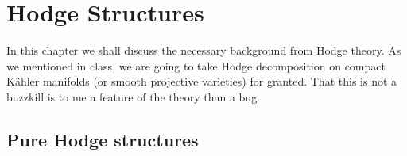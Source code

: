 \documentclass[a4paper,12pt]{book}
\begin{document}
\chapter{Hodge Structures}
\label{chap:hodge-structures}

In this chapter we shall discuss the necessary background from Hodge theory. As we mentioned in class, we are going to take Hodge decomposition on compact K\"ahler manifolds (or smooth projective varieties) for granted. That this is not a buzzkill is to me a feature of the theory than a bug.   

\section{Pure Hodge structures}
\label{sec:pure-HS}




\end{document}
